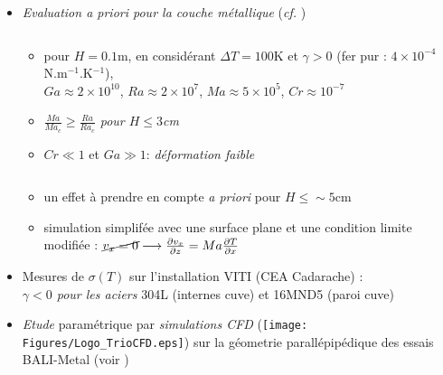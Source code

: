 \begin{frame}[fragile]
\begin{itemize}
\item \emph{Evaluation \textit{a priori} pour la couche métallique} (\textit{cf.} \cite{Saas2017})
\begin{columns}[T]
    \begin{column}{0.6\textwidth}
    \baselineskip
    \begin{itemize}
\item pour $H=0.1$m, en considérant $\Delta T = 100$K et \emph{$\gamma>0$} (fer pur : $4\times 10^{-4}$N.m$^{-1}$.K$^{-1}$), \\
$Ga\approx 2\times 10^{10}$, $Ra\approx 2\times 10^{7}$, $Ma\approx 5\times 10^{5}$, $Cr\approx 10^{-7}$
\item \emph{$\frac{Ma}{Ma_c}\ge\frac{Ra}{Ra_c}$ pour $H\le 3$cm}
\item $Cr\ll 1$ et $Ga\gg 1$: \emph{déformation faible}
\end{itemize}
    \end{column}
    \end{columns}
    \begin{itemize}
    \item un effet à prendre en compte \textit{a priori} pour $H \le \sim 5$cm
    \item simulation simplifée avec une surface plane et une condition limite modifiée : $\cancel{v_x=0} \longrightarrow \frac{\partial v_x}{\partial z} = Ma \frac{\partial T}{\partial x}$
    \end{itemize}
\item Mesures de $\sigma(T)$ sur l'installation VITI (CEA Cadarache) \cite{Chikhi2019} : \\ \emph{$\gamma<0$ pour les aciers} 304L (internes cuve) et 16MND5 (paroi cuve)
\item \emph{Etude} paramétrique par \emph{simulations CFD} (\texttt{[image: Figures/Logo\_TrioCFD.eps]}) sur la géometrie parallépipédique des essais BALI-Metal (voir \cite{Peybernes2019})
\end{itemize}
\end{frame}
